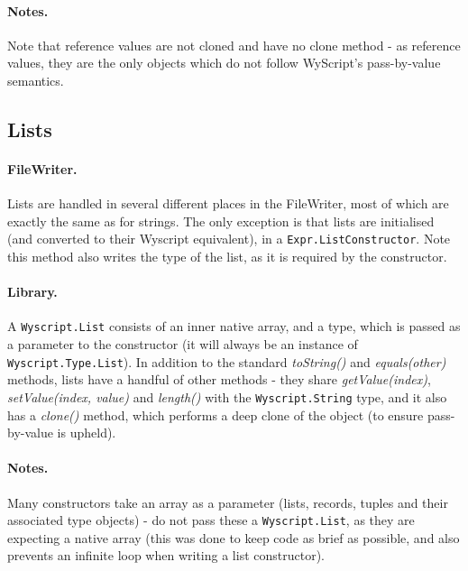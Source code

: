 \paragraph{Notes.} Note that reference values are not cloned and have no clone method - as reference values, they are the only objects which do not follow WyScript's pass-by-value semantics.



\subsection{Lists}
\label{c_types_list}

\paragraph{FileWriter.} Lists are handled in several different places in the FileWriter, most of which are exactly the same as for strings. The only exception is that lists are initialised (and converted to their Wyscript equivalent), in a \lstinline{Expr.ListConstructor}. Note this method also writes the type of the list, as it is required by the constructor.

\paragraph{Library.} A \lstinline{Wyscript.List} consists of an inner native array, and a type, which is passed as a parameter to the constructor (it will always be an instance of \lstinline{Wyscript.Type.List}). In addition to the standard {\em toString()} and {\em equals(other)} methods, lists have a handful of other methods - they share {\em getValue(index)}, {\em setValue(index, value)} and {\em length()} with the \lstinline{Wyscript.String} type, and it also has a {\em clone()} method, which performs a deep clone of the object (to ensure pass-by-value is upheld).

\paragraph{Notes.} Many constructors take an array as a parameter (lists, records, tuples and their associated type objects) - do not pass these a \lstinline{Wyscript.List}, as they are expecting a native array (this was done to keep code as brief as possible, and also prevents an infinite loop when writing a list constructor).\pagebreak

